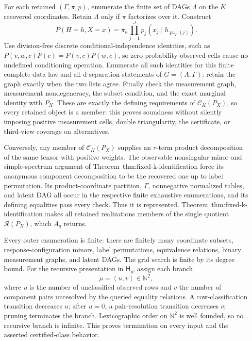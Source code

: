 For each retained \((\Gamma,\pi,p)\), enumerate the finite set of DAGs \(\Lambda\) on the \(K\) recovered coordinates.  Retain \(\Lambda\) only if \(\pi\) factorizes over it.  Construct
\[
 P(H=h,X=x)=\pi_h\prod_{j=1}^J
 p_j(x_j\mid h_{\operatorname{pa}_{\Gamma}(j)}).
\]
Use division-free discrete conditional-independence identities, such as \(P(v,w,c)P(c)=P(v,c)P(w,c)\), so zero-probability observed cells cause no undefined conditioning operation.  Enumerate all such identities for this finite complete-data law and all d-separation statements of \(G=(\Lambda,\Gamma)\); retain the graph exactly when the two lists agree.  Finally check the measurement graph, measurement nondegeneracy, the subset condition, and the exact marginal identity with \(P_X\).  These are exactly the defining requirements of \(\mathcal C_K(P_X)\), so every retained object is a member: this proves soundness without silently imposing positive measurement cells, double triangularity, the certificate, or third-view coverage on alternatives.

Conversely, any member of \(\mathcal C_K(P_X)\) supplies an \(r\)-term product decomposition of the same tensor with positive weights.  The observable nonsingular minor and simple-spectrum argument of Theorem~\textnormal{thm:fixed-k-identification} force its anonymous component decomposition to be the recovered one up to label permutation.  Its product-coordinate partition, \(\Gamma\), nonnegative normalized tables, and latent DAG all occur in the respective finite exhaustive enumerations, and its defining equalities pass every check.  Thus it is represented.  Theorem~\textnormal{thm:fixed-k-identification} makes all retained realizations members of the single quotient \(\mathcal R(P_X)\), which \(A_q\) returns.

Every outer enumeration is finite: there are finitely many coordinate subsets, response-configuration minors, label permutations, equivalence relations, binary measurement graphs, and latent DAGs.  The grid search is finite by its degree bound.  For the recursive presentation in \(\mathsf H_q\), assign each branch
\[
 \mu=(u,v)\in\mathbb N^2,
\]
where \(u\) is the number of unclassified observed rows and \(v\) the number of component pairs unresolved by the queried equality relations.  A row-classification transition decreases \(u\); after \(u=0\), a pair-resolution transition decreases \(v\); pruning terminates the branch.  Lexicographic order on \(\mathbb N^2\) is well founded, so no recursive branch is infinite.  This proves termination on every input and the asserted certified-class behavior.
